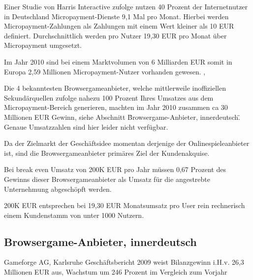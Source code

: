 Einer Studie von Harris Interactive zufolge \cite{da3} nutzen 40 Prozent der
Internetnutzer in Deutschland Micropayment-Dienste 9,1 Mal pro Monat. Hierbei werden
Micropayment-Zahlungen als Zahlungen mit einem Wert kleiner als 10 EUR
definiert. Durchschnittlich werden pro Nutzer 19,30 EUR pro Monat über
Micropayment umgesetzt. \newline 

Im Jahr 2010 sind bei einem Marktvolumen von 6 Milliarden EUR somit in Europa
2,59 Millionen Micropayment-Nutzer vorhanden gewesen. \cite{da2}, \cite{da3} \newline 

Die 4 bekanntesten Browsergameanbieter, welche mittlerweile inoffiziellen
Sekundärquellen zufolge nahezu 100 Prozent Ihres Umsatzes aus dem
Micropayment-Bereich generieren, machten im Jahr 2010 zusammen ca 30 Millionen
EUR Gewinn, siehe Abschnitt \"Browsergame-Anbieter, innerdeutsch\". Genaue
Umsatzzahlen sind hier leider nicht verfügbar. \newline

Da der Zielmarkt der Geschäftsidee momentan derjenige der Onlinespieleanbieter
ist, sind die Browsergameanbieter primäres Ziel der Kundenakquise. \newline

Bei break even Umsatz von 200K EUR pro Jahr müssen 0,67 Prozent des Gewinns
dieser Browsergameanbieter als Umsatz für die angestrebte Unternehmung
abgeschöpft werden.  \newline 

200K EUR entsprechen bei 19,30 EUR Monatsumsatz pro User rein rechnerisch einem
Kundenstamm von unter 1000 Nutzern. \newline 


\subsection{Browsergame-Anbieter, innerdeutsch}


Gameforge AG, Karlsruhe\newline \newline
Geschäftsbericht 2009 weist Bilanzgewinn i.H.v. 26,3 Millionen EUR aus,
Wachstum um 246 Prozent im Vergleich zum Vorjahr \newline

